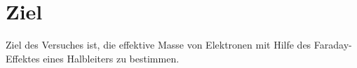 \section{Ziel}
Ziel des Versuches ist, die effektive Masse von Elektronen mit Hilfe des Faraday-Effektes eines Halbleiters zu bestimmen.
